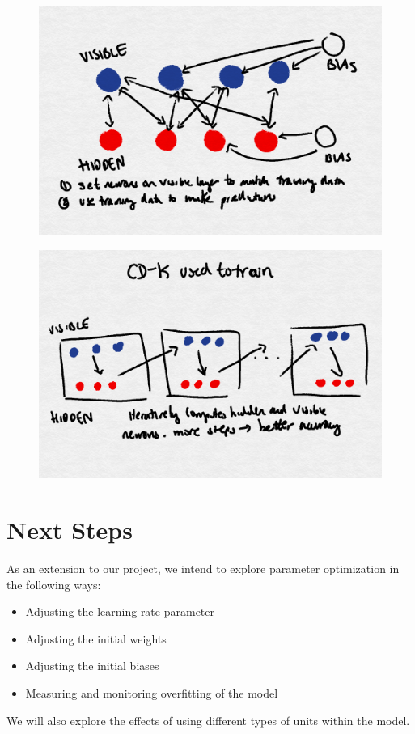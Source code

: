 \documentclass[12pt]{article}
\begin{document}
\begin{figure}
  \centerline{\includegraphics[scale=0.3]{layers_rbm.png}}
  \caption{}
\end{figure}

\begin{figure}
  \centerline{\includegraphics[scale=0.3]{cdk-1.png}}
  \caption{}
\end{figure}

\section{Next Steps}

As an extension to our project, we intend to explore parameter optimization in the following ways:
\begin{itemize}
  \item Adjusting the learning rate parameter
  \item Adjusting the initial weights 
  \item Adjusting the initial biases
  \item Measuring and monitoring overfitting of the model
\end{itemize}

We will also explore the effects of using different types of units within the model. 
\end{document}
